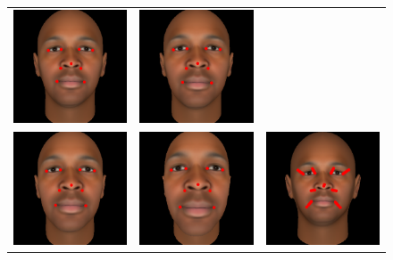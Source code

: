 \documentclass[runningheads]{llncs}
\begin{document}
\begin{figure}[ht!]
\begin{tabular}{ccc}
\includegraphics[width=.33\linewidth]{resources/figures/extracted_fiducial_0003.png} &
\includegraphics[width=.33\linewidth]{resources/figures/extracted_fiducial_0004.png} \\
\includegraphics[width=.33\linewidth]{resources/figures/extracted_fiducial_0005.png} &
\includegraphics[width=.33\linewidth]{resources/figures/extracted_fiducial_0007.png} &
\includegraphics[width=.33\linewidth]{resources/figures/fiducial_migration.png}

\end{tabular}
\end{figure}
\end{document}

